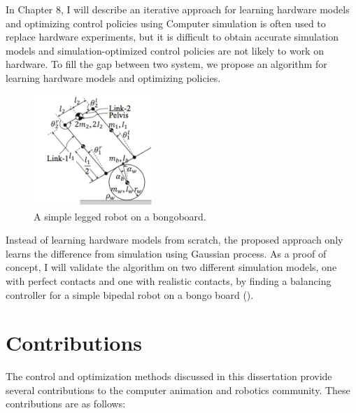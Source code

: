In Chapter 8, I will describe an iterative approach for learning 
hardware models and optimizing control policies using  
Computer simulation is often used to replace hardware experiments,
but it is difficult to obtain accurate simulation models and
simulation-optimized control policies are not likely to work on hardware.
To fill the gap between two system, we propose an algorithm for learning
hardware models and optimizing policies. 
\begin{figure}
 \vspace{-10pt}
  \begin{center}
    \includegraphics[width=0.40\textwidth]{images/intro_simple_robot.png}
  \end{center}
   \vspace{-25pt}
  \caption{A simple legged robot on a bongoboard.}
  \label{fig:intro_bongo}
   \vspace{-10pt}
\end{figure}
Instead of learning hardware models from scratch, the proposed approach only
learns the difference from simulation  using Gaussian process.
As a proof of concept, I will validate the algorithm on two different 
simulation models, one with perfect contacts and one with realistic contacts,
by finding a balancing controller for a simple bipedal robot on a bongo board
().

\section{Contributions}
The control and optimization methods discussed in this dissertation provide
several contributions to the computer animation and robotics community. 
These contributions are as follows:

